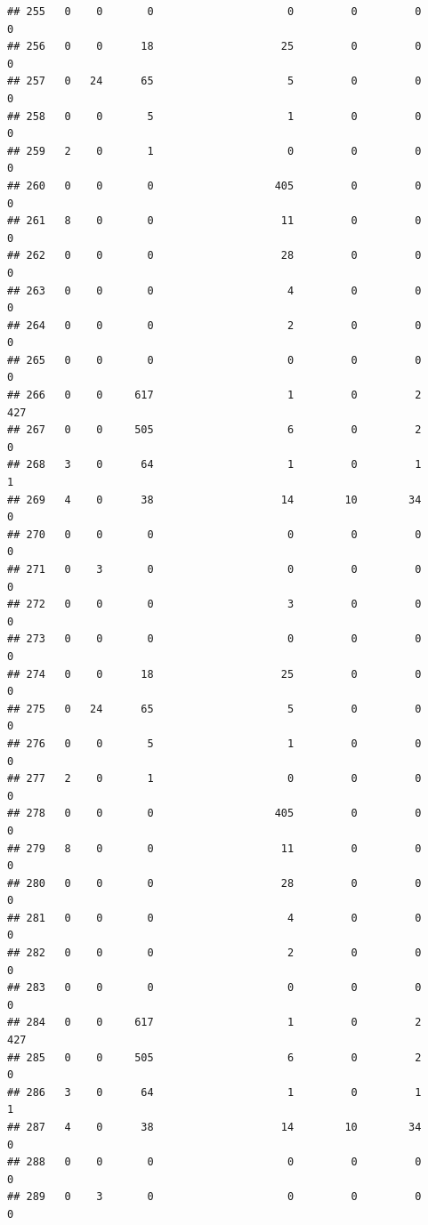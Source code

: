 \documentclass[
]{article}
\begin{document}
\begin{verbatim}
## 255   0    0       0                     0         0         0        0
## 256   0    0      18                    25         0         0        0
## 257   0   24      65                     5         0         0        0
## 258   0    0       5                     1         0         0        0
## 259   2    0       1                     0         0         0        0
## 260   0    0       0                   405         0         0        0
## 261   8    0       0                    11         0         0        0
## 262   0    0       0                    28         0         0        0
## 263   0    0       0                     4         0         0        0
## 264   0    0       0                     2         0         0        0
## 265   0    0       0                     0         0         0        0
## 266   0    0     617                     1         0         2      427
## 267   0    0     505                     6         0         2        0
## 268   3    0      64                     1         0         1        1
## 269   4    0      38                    14        10        34        0
## 270   0    0       0                     0         0         0        0
## 271   0    3       0                     0         0         0        0
## 272   0    0       0                     3         0         0        0
## 273   0    0       0                     0         0         0        0
## 274   0    0      18                    25         0         0        0
## 275   0   24      65                     5         0         0        0
## 276   0    0       5                     1         0         0        0
## 277   2    0       1                     0         0         0        0
## 278   0    0       0                   405         0         0        0
## 279   8    0       0                    11         0         0        0
## 280   0    0       0                    28         0         0        0
## 281   0    0       0                     4         0         0        0
## 282   0    0       0                     2         0         0        0
## 283   0    0       0                     0         0         0        0
## 284   0    0     617                     1         0         2      427
## 285   0    0     505                     6         0         2        0
## 286   3    0      64                     1         0         1        1
## 287   4    0      38                    14        10        34        0
## 288   0    0       0                     0         0         0        0
## 289   0    3       0                     0         0         0        0

\end{verbatim}
\end{document}
